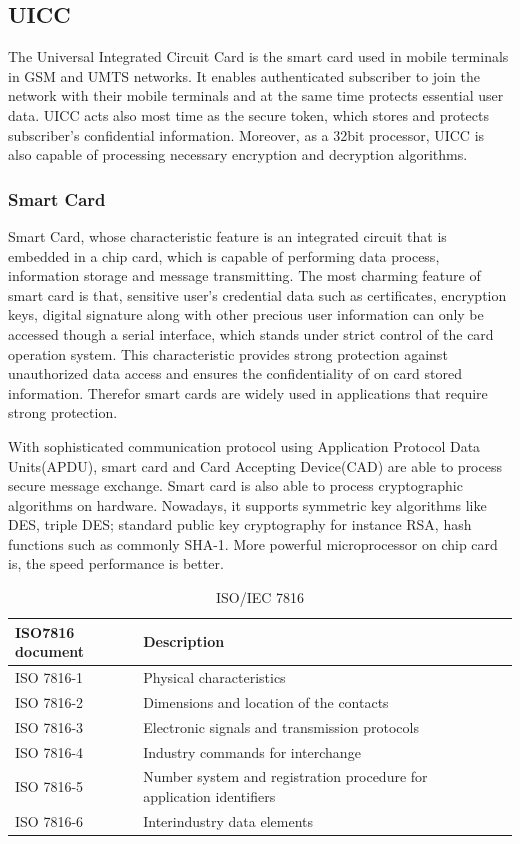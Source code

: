 \documentclass[]{llncs}
\begin{document}
\subsection{UICC}
The Universal Integrated Circuit Card is the smart card used in mobile terminals in GSM and UMTS networks. It enables authenticated subscriber to join the network with their mobile terminals and at the same time protects essential user data. UICC acts  also most time as the secure token, which stores and protects subscriber's confidential information. Moreover, as a 32bit processor, UICC is also capable of processing necessary  encryption and  decryption algorithms\cite{uiccDef}.

\subsubsection{Smart Card}
Smart Card, whose characteristic feature is an integrated circuit that is embedded in a chip card, which is capable of performing data process, information storage and message transmitting\cite{handbuch}. The most charming feature of smart card is that, sensitive user's credential data such as certificates, encryption keys, digital signature along with other precious user information can only be accessed though a serial interface, which stands under  strict control of the card operation system. This characteristic provides strong  protection against  unauthorized data access and ensures the confidentiality of on card stored information. Therefor smart cards are widely used in applications that require strong protection.

With sophisticated communication protocol using Application Protocol Data Units(APDU), smart card and Card Accepting Device(CAD) are able to process secure message exchange. Smart card is also able to process cryptographic algorithms on hardware. Nowadays, it supports symmetric key algorithms like DES, triple DES; standard public key cryptography for instance RSA, hash functions such as commonly SHA-1\cite{handbuch}. More powerful microprocessor on chip card is, the speed performance is better.  

\begin{table}[ht]
\caption{ISO/IEC 7816\cite{handbuch}}
\centering
\begin{tabular}{lllll}
 ISO7816 document & Description  \\[1ex]
\hline\hline
 ISO 7816-1&Physical characteristics   \\
ISO 7816-2&Dimensions and location of the contacts   \\
 ISO 7816-3& Electronic signals and transmission protocols   \\
ISO 7816-4&Industry commands for interchange  \\
ISO 7816-5& Number system and registration procedure for application identifiers \\
ISO 7816-6& Interindustry data elements  \\
\hline
\end{tabular}
\label{table:ISO7816}
\end{table}
\end{document}
